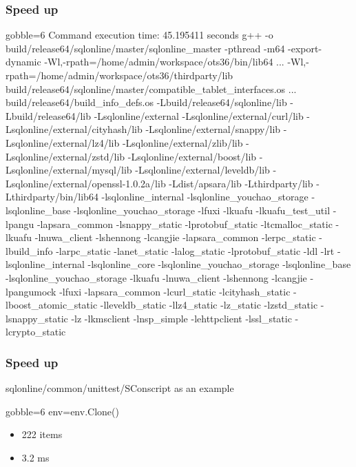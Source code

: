 \documentclass[lualatex]{beamer}
\begin{document}
\begin{frame}[fragile]
  \frametitle{Speed up}

  \begin{block}{3.6}
    \begin{txt*}{gobble=6}
      Command execution time: 45.195411 seconds
      g++ -o build/release64/sqlonline/master/sqlonline_master -pthread -m64 -export-dynamic -Wl,-rpath=/home/admin/workspace/ots36/bin/lib64 ... -Wl,-rpath=/home/admin/workspace/ots36/thirdparty/lib build/release64/sqlonline/master/compatible_tablet_interfaces.os ... build/release64/build_info_defs.os -Lbuild/release64/sqlonline/lib -Lbuild/release64/lib -Lsqlonline/external -Lsqlonline/external/curl/lib -Lsqlonline/external/cityhash/lib -Lsqlonline/external/snappy/lib -Lsqlonline/external/lz4/lib -Lsqlonline/external/zlib/lib -Lsqlonline/external/zstd/lib -Lsqlonline/external/boost/lib -Lsqlonline/external/mysql/lib -Lsqlonline/external/leveldb/lib -Lsqlonline/external/openssl-1.0.2a/lib -Ldist/apsara/lib -Lthirdparty/lib -Lthirdparty/bin/lib64 -lsqlonline_internal -lsqlonline_youchao_storage -lsqlonline_base -lsqlonline_youchao_storage -lfuxi -lkuafu -lkuafu_test_util -lpangu -lapsara_common -lsnappy_static -lprotobuf_static -ltcmalloc_static -lkuafu -lnuwa_client -lshennong -lcangjie -lapsara_common -lerpc_static -lbuild_info -larpc_static -lanet_static -lalog_static -lprotobuf_static -ldl -lrt -lsqlonline_internal -lsqlonline_core -lsqlonline_youchao_storage -lsqlonline_base -lsqlonline_youchao_storage -lkuafu -lnuwa_client -lshennong -lcangjie -lpangumock -lfuxi -lapsara_common -lcurl_static -lcityhash_static -lboost_atomic_static -lleveldb_static -llz4_static -lz_static -lzstd_static -lsnappy_static -lz -lkmsclient -lnsp_simple -lehttpclient -lssl_static -lcrypto_static
    \end{txt*}
  \end{block}
\end{frame}

\begin{frame}[fragile]
  \frametitle{Speed up}

  \begin{block}{sqlonline/common/unittest/SConscript as an example}
    \begin{py*}{gobble=6}
      env=env.Clone()
    \end{py*}
    \begin{itemize}
    \item 222 items
    \item 3.2 ms
    \end{itemize}
  \end{block}
\end{frame}
\end{document}
